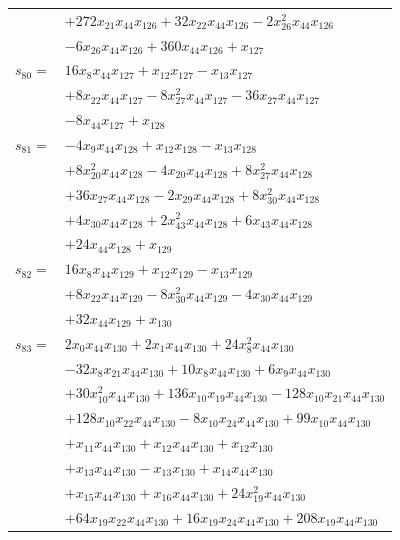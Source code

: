 \begin{longtable}{@{}r@{\;}l@{}}
 & \(\displaystyle +272x_{21}x_{44}x_{126} +32x_{22}x_{44}x_{126} -2x_{26}^{2}x_{44}x_{126}\) \\
 & \(\displaystyle -6x_{26}x_{44}x_{126} +360x_{44}x_{126} +x_{127}\) \\[3pt]
\(s_{80}=\) & \(\displaystyle 16x_{8}x_{44}x_{127} +x_{12}x_{127} -x_{13}x_{127}\) \\
 & \(\displaystyle +8x_{22}x_{44}x_{127} -8x_{27}^{2}x_{44}x_{127} -36x_{27}x_{44}x_{127}\) \\
 & \(\displaystyle -8x_{44}x_{127} +x_{128}\) \\[3pt]
\(s_{81}=\) & \(\displaystyle -4x_{9}x_{44}x_{128} +x_{12}x_{128} -x_{13}x_{128}\) \\
 & \(\displaystyle +8x_{20}^{2}x_{44}x_{128} -4x_{20}x_{44}x_{128} +8x_{27}^{2}x_{44}x_{128}\) \\
 & \(\displaystyle +36x_{27}x_{44}x_{128} -2x_{29}x_{44}x_{128} +8x_{30}^{2}x_{44}x_{128}\) \\
 & \(\displaystyle +4x_{30}x_{44}x_{128} +2x_{43}^{2}x_{44}x_{128} +6x_{43}x_{44}x_{128}\) \\
 & \(\displaystyle +24x_{44}x_{128} +x_{129}\) \\[3pt]
\(s_{82}=\) & \(\displaystyle 16x_{8}x_{44}x_{129} +x_{12}x_{129} -x_{13}x_{129}\) \\
 & \(\displaystyle +8x_{22}x_{44}x_{129} -8x_{30}^{2}x_{44}x_{129} -4x_{30}x_{44}x_{129}\) \\
 & \(\displaystyle +32x_{44}x_{129} +x_{130}\) \\[3pt]
\(s_{83}=\) & \(\displaystyle 2x_{0}x_{44}x_{130} +2x_{1}x_{44}x_{130} +24x_{8}^{2}x_{44}x_{130}\) \\
 & \(\displaystyle -32x_{8}x_{21}x_{44}x_{130} +10x_{8}x_{44}x_{130} +6x_{9}x_{44}x_{130}\) \\
 & \(\displaystyle +30x_{10}^{2}x_{44}x_{130} +136x_{10}x_{19}x_{44}x_{130} -128x_{10}x_{21}x_{44}x_{130}\) \\
 & \(\displaystyle +128x_{10}x_{22}x_{44}x_{130} -8x_{10}x_{24}x_{44}x_{130} +99x_{10}x_{44}x_{130}\) \\
 & \(\displaystyle +x_{11}x_{44}x_{130} +x_{12}x_{44}x_{130} +x_{12}x_{130}\) \\
 & \(\displaystyle +x_{13}x_{44}x_{130} -x_{13}x_{130} +x_{14}x_{44}x_{130}\) \\
 & \(\displaystyle +x_{15}x_{44}x_{130} +x_{16}x_{44}x_{130} +24x_{19}^{2}x_{44}x_{130}\) \\
 & \(\displaystyle +64x_{19}x_{22}x_{44}x_{130} +16x_{19}x_{24}x_{44}x_{130} +208x_{19}x_{44}x_{130}\) \\

\end{longtable}
